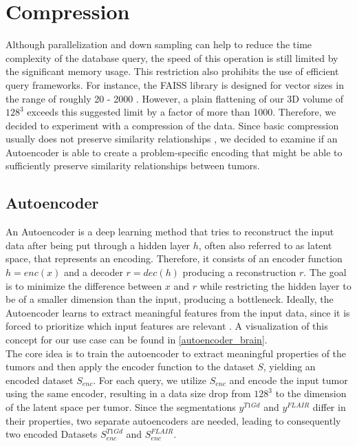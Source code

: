 
\section{Compression}
Although parallelization and down sampling can help to reduce the time complexity of the database query, the speed of this operation is still limited by the significant memory usage. This restriction also prohibits the use of efficient query frameworks. For instance, the FAISS library is designed for vector sizes in the range of roughly 20 - 2000 \parencite{FAISS}. However, a plain flattening of our 3D volume of $128^3$ exceeds this suggested limit by a factor of more than 1000. Therefore, we decided to experiment with a compression of the data. Since basic compression usually does not preserve similarity relationships ,  we decided to examine if an Autoencoder is able to create a problem-specific encoding that might be able to sufficiently preserve similarity relationships between tumors.

\subsection{Autoencoder}
An Autoencoder is a deep learning method that tries to reconstruct the input data after being put through a hidden layer $h$, often also referred to as latent space, that represents an encoding. Therefore, it consists of an encoder function $h=enc(x)$ and a decoder $r = dec(h)$ producing a reconstruction $r$. The goal is to minimize the difference between $x$ and $r$ while restricting the hidden layer to be of a smaller dimension than the input, producing a bottleneck. Ideally, the Autoencoder learns to extract meaningful features from the input data, since it is forced to prioritize which input features are relevant \parencite{Goodfellow-et-al-2016}.
A visualization of this concept for our use case can be found in \autoref{autoencoder_brain}.\\
The core idea is to train the autoencoder to extract meaningful properties of the tumors and then apply the encoder
function to the dataset $S$, yielding an encoded dataset $S_{enc}$.
For each query, we utilize $S_{enc}$ and encode the input tumor using the same encoder, resulting in a data size drop from $128^3$ to the dimension of the latent space per tumor. Since the segmentations $y^{T1Gd}$ and $y^{FLAIR}$ differ in their properties, two separate autoencoders are needed, leading to consequently two encoded Datasets $S_{enc}^{T1Gd}$ and $S_{enc}^{FLAIR}$.

